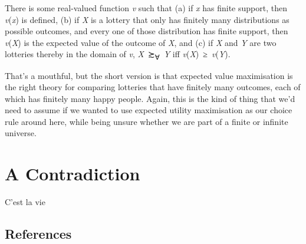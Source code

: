 \documentclass[
  11pt,
  letterpaper,
  DIV=11,
  numbers=noendperiod,
  twoside]{scrartcl}
\providecommand{\tightlist}{%
  \setlength{\itemsep}{0pt}\setlength{\parskip}{0pt}}
\begin{document}
\begin{description}
\tightlist
\item[Finite Evaluability]
There is some real-valued function \emph{v} such that (a) if \emph{x}
has finite support, then \emph{v}(\emph{x}) is defined, (b) if \emph{X}
is a lottery that only has finitely many distributions as possible
outcomes, and every one of those distribution has finite support, then
\emph{v}(\emph{X}) is the expected value of the outcome of \emph{X}, and
(c) if \emph{X} and \emph{Y} are two lotteries thereby in the domain of
\emph{v}, \emph{X}~≿\textsubscript{∀}~\emph{Y} iff
\emph{v}(\emph{X})~≥~\emph{v}(\emph{Y}).
\end{description}

That's a mouthful, but the short version is that expected value
maximisation is the right theory for comparing lotteries that have
finitely many outcomes, each of which has finitely many happy people.
Again, this is the kind of thing that we'd need to assume if we wanted
to use expected utility maximisation as our choice rule around here,
while being unsure whether we are part of a finite or infinite universe.

\section{A Contradiction}\label{a-contradiction}

C'est la vie

\subsection*{References}\label{references}
\end{document}
